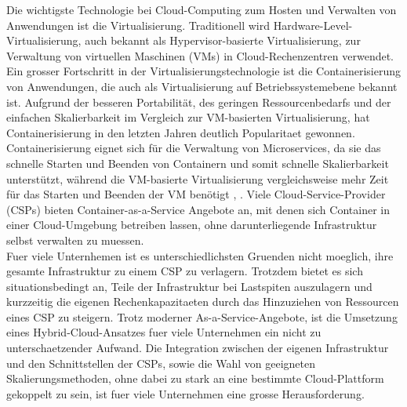 \documentclass[runningheads]{llncs}
\begin{document}
Die wichtigste Technologie bei Cloud-Computing zum Hosten und Verwalten von Anwendungen ist die Virtualisierung. Traditionell wird Hardware-Level-Virtualisierung, auch bekannt als Hypervisor-basierte Virtualisierung, zur Verwaltung von virtuellen Maschinen (VMs) in Cloud-Rechenzentren verwendet. Ein grosser Fortschritt in der Virtualisierungstechnologie ist die Containerisierung von Anwendungen, die auch als Virtualisierung auf Betriebssystemebene bekannt ist. Aufgrund der besseren Portabilität, des geringen Ressourcenbedarfs und der einfachen Skalierbarkeit im Vergleich zur VM-basierten Virtualisierung, hat Containerisierung in den letzten Jahren deutlich Popularitaet gewonnen. Containerisierung eignet sich für die Verwaltung von Microservices, da sie das schnelle Starten und Beenden von Containern und somit schnelle Skalierbarkeit unterstützt, während die VM-basierte Virtualisierung vergleichsweise mehr Zeit für das Starten und Beenden der VM benötigt \cite{al-dhuraibi_elasticity_2018}, \cite{abdullah_containers_2019}. Viele Cloud-Service-Provider (CSPs) bieten Container-as-a-Service Angebote an, mit denen sich Container in einer Cloud-Umgebung betreiben lassen, ohne darunterliegende Infrastruktur selbst verwalten zu muessen. \\

Fuer viele Unternhemen ist es unterschiedlichsten Gruenden nicht moeglich, ihre gesamte Infrastruktur zu einem CSP zu verlagern. Trotzdem bietet es sich situationsbedingt an, Teile der Infrastruktur bei Lastspiten auszulagern und kurzzeitig die eigenen Rechenkapazitaeten durch das Hinzuziehen von Ressourcen eines CSP zu steigern.
Trotz moderner As-a-Service-Angebote, ist die Umsetzung eines Hybrid-Cloud-Ansatzes fuer viele Unternehmen ein nicht zu unterschaetzender Aufwand. Die Integration zwischen der eigenen Infrastruktur und den Schnittstellen der CSPs, sowie die Wahl von geeigneten Skalierungsmethoden, ohne dabei zu stark an eine bestimmte Cloud-Plattform gekoppelt zu sein, ist fuer viele Unternehmen eine grosse Herausforderung.  \\
\end{document}
